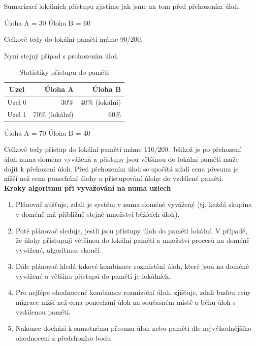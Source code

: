 \documentclass[
  field=ainfk,
  biblatex,
  glossaries,
  index
]{kidiplom}
\begin{document}
\noindent
Sumarizací lokálních přístupu zjistíme jak jsme na tom před přehozením úloh.

\noindent
Úloha A = 30
Úloha B = 60

\noindent
Celkově tedy do lokální paměti máme 90/200.

\noindent
Nyní stejný případ s prohozením úloh

\begin{table}[h]
\centering
\begin{tabular}{|c|r|r|}
\hline
Uzel & Úloha A & Úloha B \\
\hline
Uzel 0 & 30\% & 40\% (lokální)\\
\hline
Uzel 1 & 70\% (lokální) & 60\% \\
\hline
\end{tabular}
\caption{Statistiky přístupu do paměti}
\label{table6}
\end{table}

\noindent
Úloha A = 70
Úloha B = 40

\noindent
Celkově tedy přístup do lokální paměti máme 110/200. Jelikož je po přehození úloh numa doména vyvážená a přístupy jsou většinou do lokální paměti může dojít k přehození úloh. Před přehozením úloh se spočítá zdali cena přesunu je nižší než cena ponechání úlohy a přistupování úlohy do vzdálené paměti. \\


\noindent
\textbf{Kroky algoritmu při vyvažování na numa uzlech}
\begin{enumerate}
\item Plánovač zjišťuje, zdali je systém v numa doméně vyvážený (tj. každá skupina v doméně má přibližně stejné množství běžících úloh).
\item Poté plánovač sleduje, jestli jsou přístupy úloh do paměti lokální. V případě, že úlohy přistupují většinou do lokální paměti a množství procesů na doméně vyvážené, algoritmus skončí. 
\item Dále plánovač hledá takové kombinace rozmístění úloh, které jsou na doméně vyvážené a většinu přístupů do paměti je lokálních.
\item Pro nejlépe ohodnocené kombinace rozmístění úloh, zjišťuje, zdali budou ceny migrace nižší než cena ponechání úloh na současném místě a běhu úloh s vzdálenou pamětí.
\item Nakonec dochází k samotnému přesunu úloh nebo pamětí dle nejvýhodnějšího ohodnocení z předchozího bodu
\end{enumerate}
\end{document}
